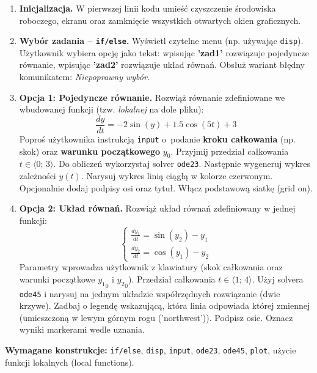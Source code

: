 \documentclass[a4paper,11pt]{article}
\begin{document}
\begin{enumerate}[leftmargin=*, label=\textbf{\arabic*.}, itemsep=2pt]

  \item \textbf{Inicjalizacja.}
    W pierwszej linii kodu umieść czyszczenie środowiska roboczego, ekranu oraz zamknięcie wszystkich otwartych okien graficznych.

  \item \textbf{Wybór zadania -- \texttt{if/else}.}
    Wyświetl czytelne menu (np. używając \texttt{disp}). Użytkownik wybiera opcję jako tekst: wpisując \textbf{'zad1'} rozwiązuje pojedyncze równanie, wpisując \textbf{'zad2'} rozwiązuje układ równań. Obsłuż wariant błędny komunikatem: \textit{Niepoprawny wybór}.

  \item \textbf{Opcja 1: Pojedyncze równanie.}
    Rozwiąż równanie zdefiniowane we wbudowanej funkcji (tzw. \textit{lokalnej} na dole pliku):
    \[ \frac{dy}{dt} = -2\sin(y) + 1.5\cos(5t) + 3 \]
    Poproś użytkownika instrukcją \texttt{input} o~podanie \textbf{kroku całkowania} (np. skok) oraz \textbf{warunku początkowego} $y_0$. Przyjmij przedział całkowania $t \in \langle 0;\,3 \rangle$.
    Do obliczeń wykorzystaj solver \texttt{ode23}. Następnie wygeneruj wykres zależności $y(t)$. Narysuj wykres linią ciągłą w kolorze czerwonym. Opcjonalnie dodaj podpisy osi oraz tytuł. Włącz podstawową siatkę (grid on).

  \item \textbf{Opcja 2: Układ równań.}
    Rozwiąż układ równań zdefiniowany w jednej funkcji:\\[-0.5em]
    \[
    \begin{cases}
      \frac{dy_1}{dt} = \sin(y_2) - y_1 \\
      \frac{dy_2}{dt} = \cos(y_1) - y_2
    \end{cases}
    \]
    Parametry wprowadza użytkownik z klawiatury (skok całkowania oraz warunki początkowe $ {y_1}_{0} $ i $ {y_2}_{0} $). Przedział całkowania $t \in \langle 1;\,4 \rangle$.
    Użyj solvera \texttt{ode45} i narysuj na jednym układzie współrzędnych rozwiązanie (dwie krzywe). Zadbaj o legendę wskazującą, która linia odpowiada której zmiennej (umieszczoną w lewym górnym rogu ('northwest')). Podpisz osie. Oznacz wyniki markerami wedle uznania.

\end{enumerate}

\vspace{0.3cm}
\begin{ramka}
\textbf{Wymagane konstrukcje:}
\texttt{if/else}, \texttt{disp}, \texttt{input}, \texttt{ode23}, \texttt{ode45}, \texttt{plot}, użycie funkcji lokalnych (local functions).
\end{ramka}
\end{document}

